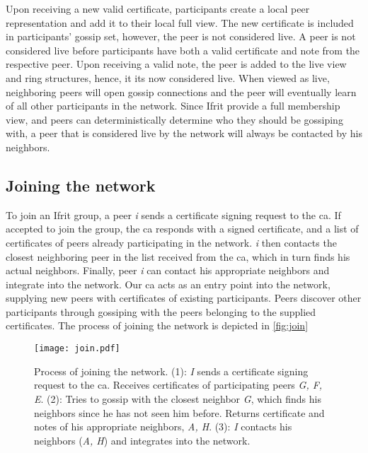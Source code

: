 \documentclass[USenglish]{uit-thesis}
\begin{document}
\begin{code}
\end{code}


Upon receiving a new valid certificate, participants create a local peer representation and add it to their local full view.
The new certificate is included in participants' gossip set, however, the peer is not considered live.
A peer is not considered live before participants have both a valid certificate and note from the respective peer.
Upon receiving a valid note, the peer is added to the live view and ring structures, hence, it its now considered live.
When viewed as live, neighboring peers will open gossip connections and the peer will eventually learn of all other participants in the network. 
Since Ifrit provide a full membership view, and peers can deterministically determine who they should be gossiping with, a peer that is considered live by the network will always be contacted by his neighbors.



\subsection{Joining the network}
To join an Ifrit group, a peer \textit{i} sends a certificate signing request to the \gls{ca}.
If accepted to join the group, the \gls{ca} responds with a signed certificate, and a list of certificates of peers already participating in the network.
\textit{i} then contacts the closest neighboring peer in the list received from the \gls{ca}, which in turn finds his actual neighbors.
Finally, peer \textit{i} can contact his appropriate neighbors and integrate into the network.
Our \gls{ca} acts as an entry point into the network, supplying new peers with certificates of existing participants.
Peers discover other participants through gossiping with the peers belonging to the supplied certificates.
The process of joining the network is depicted in \autoref{fig:join}

\begin{figure}[h]
	\centering
	\texttt{[image: join.pdf]}
	\caption{Process of joining the network. 
		(1): \textit{I} sends a certificate signing request to the \gls{ca}. Receives certificates of participating peers \textit{G, F, E}.
		(2): Tries to gossip with the closest neighbor \textit{G}, which finds his neighbors since he has not seen him before. Returns certificate and notes of his appropriate neighbors, \textit{A, H}.
		(3): \textit{I} contacts his neighbors (\textit{A, H}) and integrates into the network.}
	\label{fig:join}
\end{figure} 
\end{document}
